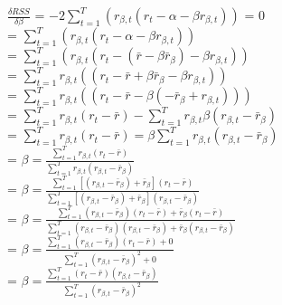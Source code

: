 \documentclass[11pt]{article}
\begin{document}
$\frac{\delta RSS}{\delta \beta}$ = $-2 \sum_{t=1}^{T} (r_{\beta,t} (r_{t} - \alpha - \beta r_{\beta,t}))$ = 0\\
= $\sum_{t=1}^{T} (r_{\beta,t} (r_{t} - \alpha - \beta r_{\beta,t}))$\\
= $\sum_{t=1}^{T} (r_{\beta,t} (r_{t} - (\bar{r} - \beta \bar{r}_{\beta}) - \beta r_{\beta,t}))$\\
= $\sum_{t=1}^{T} r_{\beta,t} ((r_{t} - \bar{r} + \beta \bar{r}_{\beta} - \beta r_{\beta,t}))$\\
= $\sum_{t=1}^{T} r_{\beta,t} ((r_{t} - \bar{r} - \beta (-\bar{r}_{\beta} + r_{\beta,t})))$\\
= $\sum_{t=1}^{T} r_{\beta,t} (r_{t} - \bar{r}) - \sum_{t=1}^{T} r_{\beta,t} \beta (r_{\beta,t} - \bar{r}_{\beta})$\\
= $\sum_{t=1}^{T} r_{\beta,t} (r_{t} - \bar{r}) = \beta \sum_{t=1}^{T} r_{\beta,t} (r_{\beta,t} - \bar{r}_{\beta})$\\
= $\beta = \frac{\sum_{t=1}^{T} r_{\beta,t} (r_{t} - \bar{r})}{\sum_{t=1}^{T} r_{\beta,t} (r_{\beta,t} - \bar{r}_{\beta})}$\\
= $\beta = \frac{\sum_{t=1}^{T} [(r_{\beta,t} - \bar{r}_{\beta}) + \bar{r}_{\beta}] (r_{t} - \bar{r})}{\sum_{t=1}^{T} [(r_{\beta,t} - \bar{r}_{\beta}) + \bar{r}_{\beta}] (r_{\beta,t} - \bar{r}_{\beta})}$\\
= $\beta = \frac{\sum_{t=1}^{T} (r_{\beta,t} - \bar{r}_{\beta})(r_{t} - \bar{r}) + \bar{r}_{\beta} (r_{t} - \bar{r})}{\sum_{t=1}^{T} (r_{\beta,t} - \bar{r}_{\beta})(r_{\beta,t} - \bar{r}_{\beta}) + \bar{r}_{\beta}(r_{\beta,t} - \bar{r}_{\beta})}$\\
= $\beta = \frac{\sum_{t=1}^{T} (r_{\beta,t} - \bar{r}_{\beta})(r_{t} - \bar{r}) + 0}{\sum_{t=1}^{T} (r_{\beta,t} - \bar{r}_{\beta})^{2} + 0}$\\
= $\beta = \frac{\sum_{t=1}^{T} (r_{t} - \bar{r})(r_{\beta,t} - \bar{r}_{\beta})}{\sum_{t=1}^{T} (r_{\beta,t} - \bar{r}_{\beta})^{2}}$\\
\pagebreak
\end{document}
